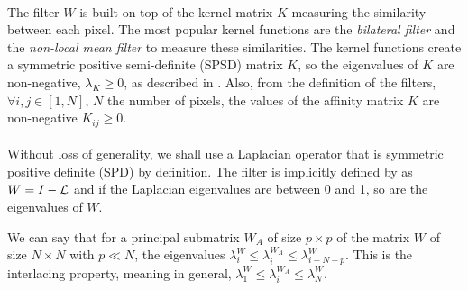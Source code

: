 \paragraph{}
The filter \(W\) is built on top of the kernel matrix \(K\) measuring the similarity between each pixel.
The most popular kernel functions are the \textit{bilateral filter} \cite{bilateral_tomasi_1998} and the \textit{non-local mean filter} \cite{kervrann_nlm_2006} to measure these similarities.
The kernel functions create a symmetric positive semi-definite (SPSD) matrix \(K\), so the eigenvalues of \(K\) are non-negative, \(\lambda_K \ge 0\), as described in \cite{talebi_fast_2016}.
Also, from the definition of the filters, \(\forall i, j \in [1, N]\), \(N\) the number of pixels, the values of the affinity matrix \(K\) are non-negative \(K_{ij} \ge 0\).

\paragraph{}
Without loss of generality, we shall use a Laplacian operator that is symmetric positive definite (SPD) by definition.
The filter is implicitly defined by \cite{modern_tour_2013} as \(W = I - \operatorname{\mathcal{L}}\) and if the Laplacian eigenvalues are between 0 and 1, so are the eigenvalues of \(W\).

We can say that for a principal submatrix \(W_A\) of size \(p \times p\) of the matrix \(W\) of size \(N \times N\) with \(p \ll N\), the eigenvalues \(\lambda^W_i \le \lambda^{W_A}_i \le \lambda^W_{i+N-p}\).
This is the interlacing property, meaning in general, \(\lambda^W_1 \le \lambda^{W_A}_i \le \lambda^W_N\).

